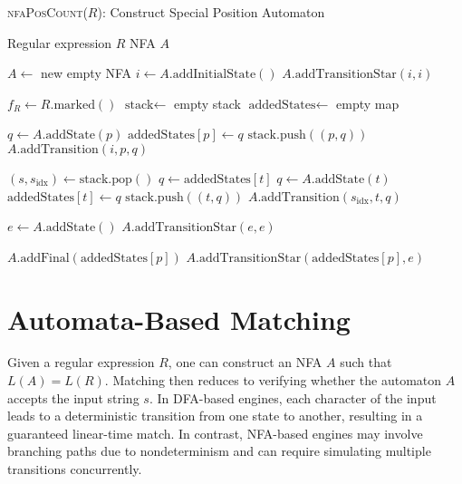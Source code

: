 \begin{algorithm}[H]
\caption{\textsc{nfaPosCount}($R$): Construct Special Position Automaton}
\label{alg:nfaPosCount}
\begin{small}
\begin{algorithmic}[1]
\Require Regular expression $R$
\Ensure NFA $A$

\State $A \gets$ new empty NFA
\State $i \gets A.\text{addInitialState}()$
\State $A.\text{addTransitionStar}(i, i)$ 

\State $f_R \gets R.\text{marked}()$
\State $\text{stack} \gets$ empty stack
\State $\text{addedStates} \gets$ empty map

    \State $q \gets A.\text{addState}(p)$
    \State $\text{addedStates}[p] \gets q$
    \State $\text{stack}.\text{push}((p, q))$
    \State $A.\text{addTransition}(i, p, q)$
\EndFor


    \State $(s, s_{\text{idx}}) \gets \text{stack}.\text{pop}()$
            \State $q \gets \text{addedStates}[t]$
        \Else
            \State $q \gets A.\text{addState}(t)$
            \State $\text{addedStates}[t] \gets q$
            \State $\text{stack}.\text{push}((t, q))$
        \EndIf
        \State $A.\text{addTransition}(s_{\text{idx}}, t, q)$
    \EndFor
\EndWhile

\State $e \gets A.\text{addState}()$
\State $A.\text{addTransitionStar}(e, e)$

        \State $A.\text{addFinal}(\text{addedStates}[p])$
        \State $A.\text{addTransitionStar}(\text{addedStates}[p], e)$
    \EndIf
\EndFor

\end{algorithmic}
\end{small}
\end{algorithm}

\section{Automata-Based Matching}

Given a regular expression $R$, one can construct an NFA $A$ such that $L(A) = L(R)$. Matching then reduces to verifying whether the automaton $A$ accepts the input string $s$. In DFA-based engines, each character of the input leads to a deterministic transition from one state to another, resulting in a guaranteed linear-time match. In contrast, NFA-based engines may involve branching paths due to nondeterminism and can require simulating multiple transitions concurrently.

